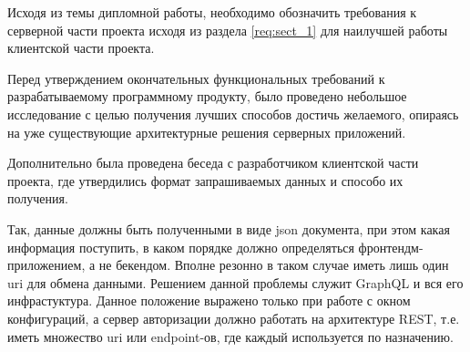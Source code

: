 \label{req:sect_2}

Исходя из темы дипломной работы, необходимо обозначить требования к серверной части проекта исходя из раздела \ref{req:sect_1} для наилучшей работы клиентской части проекта.

Перед утверждением окончательных функциональных требований к разрабатываемому программному продукту, было проведено небольшое исследование с целью получения
лучших способов достичь желаемого, опираясь на уже существующие архитектурные решения серверных приложений.

Дополнительно была проведена беседа с разработчиком клиентской части проекта, где утвердились формат запрашиваемых данных и способо их получения.

Так, данные должны быть полученными в виде json документа, при этом какая информация поступить, в каком порядке должно определяться фронтендм-приложением, а не бекендом.
Вполне резонно в таком случае иметь лишь один uri для обмена данными. Решением данной проблемы служит GraphQL и вся его инфрастуктура. Данное положение выражено только при работе
с окном конфигураций, а сервер авторизации должно работать на архитектуре REST, т.е. иметь множество uri или endpoint-ов, где каждый используется по назначению.

